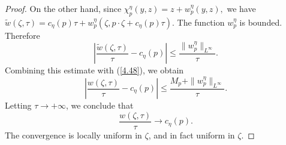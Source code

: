 \documentclass[preprint]{elsarticle}
\numberwithin{equation}{section}
\begin{document}
\begin{proof}
On the other hand, since $\chi_p^\eta(y,z)=z+w_p^\eta(y,z),$
we have $\widetilde w(\zeta,\tau)
=
c_\eta(p)\tau
+
w_p^\eta\left(\zeta,p\cdot\zeta+c_\eta(p)\tau\right).$
The function $w_p^\eta$ is bounded. Therefore
\begin{equation*}
\left|
\frac{\widetilde w(\zeta,\tau)}{\tau}
-
c_\eta(p)
\right|
\le
\frac{\|w_p^\eta\|_{L^\infty}}{\tau}.
\end{equation*}
Combining this estimate with (\ref{4.48}),
we obtain
\begin{equation*}
\left|
\frac{w(\zeta,\tau)}{\tau}
-
c_\eta(p)
\right|
\le
\frac{M_p+\|w_p^\eta\|_{L^\infty}}{\tau}.
\end{equation*}
Letting $\tau\to+\infty$, we conclude that
\begin{equation*}
\frac{w(\zeta,\tau)}{\tau}\to c_\eta(p).
\end{equation*}
The convergence is locally uniform in $\zeta$, and in fact uniform in $\zeta$.
\end{proof}
\end{document}
